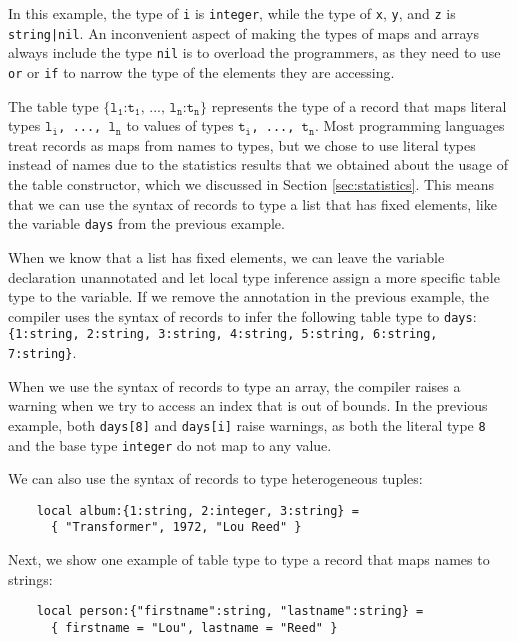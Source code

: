 In this example, the type of \texttt{i} is \texttt{integer},
while the type of \texttt{x}, \texttt{y}, and \texttt{z} is
\texttt{string|nil}.
An inconvenient aspect of making the types of maps and arrays always
include the type \texttt{nil} is to overload the programmers,
as they need to use \texttt{or} or \texttt{if} to narrow the type of
the elements they are accessing.

The table type
$\texttt{\{l}{_\texttt{1}}\texttt{:t}_{\texttt{1}}
\texttt{, ..., l}{_\texttt{n}}\texttt{:t}_{\texttt{n}}\texttt{\}}$
represents the type of a record that maps literal types
$\texttt{l}_{\texttt{i}}$\texttt{, ..., }$\texttt{l}_{\texttt{n}}$
to values of types $\texttt{t}_{\texttt{i}}$\texttt{, ..., }$\texttt{t}_{\texttt{n}}$.
Most programming languages treat records as maps from names
to types, but we chose to use literal types instead of
names due to the statistics results that we obtained about
the usage of the table constructor, which we discussed in
Section \ref{sec:statistics}.
This means that we can use the syntax of records to type a
list that has fixed elements, like the variable \texttt{days} from
the previous example.

When we know that a list has fixed elements, we can leave the
variable declaration unannotated and let local type inference assign
a more specific table type to the variable.
If we remove the annotation in the previous example, the compiler uses the
syntax of records to infer the following table type to \texttt{days}:
\texttt{\{1:string, 2:string, 3:string, 4:string, 5:string, 6:string, 7:string\}}.

When we use the syntax of records to type an array, the compiler
raises a warning when we try to access an index that is out of bounds.
In the previous example, both \texttt{days[8]} and \texttt{days[i]}
raise warnings, as both the literal type \texttt{8} and the base type
\texttt{integer} do not map to any value.

We can also use the syntax of records to type heterogeneous tuples:
\begin{verbatim}
    local album:{1:string, 2:integer, 3:string} =
      { "Transformer", 1972, "Lou Reed" }
\end{verbatim}

Next, we show one example of table type to type a record that maps
names to strings:
\begin{verbatim}
    local person:{"firstname":string, "lastname":string} =
      { firstname = "Lou", lastname = "Reed" } 
\end{verbatim}

